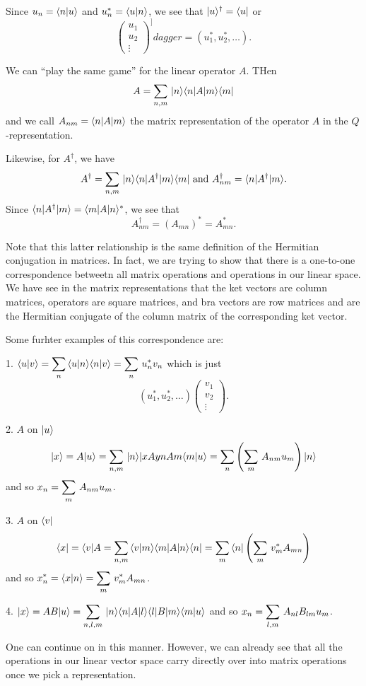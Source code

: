 Since $u_n = \langle n|u\rangle$ and $u^*_n = \langle u|n\rangle$, we see that $|u\rangle^\dagger = \langle u|$ or 
$$\begin{pmatrix}
u_1 \\ u_2 \\ \vdots
\end{pmatrix}^]dagger = (u_1^*, u_2^*, \hdots).$$

We can ``play the same game'' for the linear operator $A$. THen 
$$A = \sum_{n,m} \, |n\rangle \langle n| A| m \rangle\langle m|$$ and we call $A_{nm} = \langle n| A| m \rangle$ the matrix representation of the operator $A$ in the $Q$-representation.

Likewise, for $A^\dagger$, we have
$$A^\dagger = \sum_{n,m}\, |n\rangle\langle n| A^\dagger| m \rangle\langle m| \mbox{ and } A^\dagger_{nm} = \langle n| A^\dagger| m \rangle.$$
Since $\langle n| A^\dagger| m \rangle = \langle m| A| n \rangle^*$, we see that 
$$A^\dagger_{nm} = (A_{mn})^* = A^*_{mn}.$$

Note that this latter relationship is the same definition of the Hermitian conjugation in matrices. In fact, we are trying to show that there is a one-to-one correspondence betweetn all matrix operations and operations in our linear space. 
We have see in the matrix representations that the ket vectors are column matrices, operators are square matrices, and bra vectors are row matrices and are the Hermitian conjugate of the column matrix of the corresponding ket vector.

Some furhter examples of this correspondence are: 

1. $\displaystyle \langle u|v\rangle = \sum_n\, \langle u|n\rangle\langle n|v\rangle = \sum_n\, u^*_n v_n$ which is just
$$ (u_1^*, u_2^*,\hdots)\begin{pmatrix} v_1\\ v_2\\ \vdots \end{pmatrix}.$$

2. $A$ on $|u\rangle$  $$|x\rangle = A|u\rangle = \sum_{n,m}\, |n\rangle|xAy{n}{A}{m}\langle m|u\rangle = \sum_n\left( \sum_m\, A_{nm} u_m\right) |n\rangle$$ and so $\displaystyle x_n = \sum_m\, A_{nm}u_m$.

3. $A$ on $\langle v|$
$$\langle x| = \langle v|A = \sum_{n,m}\, \langle v|m\rangle\langle m| A| n \rangle \langle n| = \sum_m\, \langle n| \left(\sum_m\, v_m^* A_{mn}\right)$$ 
and so $\displaystyle x_n^* = \langle x|n\rangle = \sum_m\, v_m^* A_{mn}$.

4. $\displaystyle|x\rangle = AB|u\rangle = \sum_{n,l,m}\, |n\rangle \langle n| A| l \rangle \langle l| B| m \rangle\langle m|u\rangle$ and so $\displaystyle x_n = \sum_{l,m} \, A_{nl} B_{lm} u_m$. 

One can continue on in this manner. However, we can already see that all the operations in our linear vector space carry directly over into matrix operations once we pick a representation.

